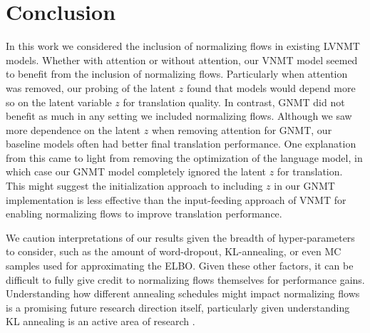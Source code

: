 \chapter{Conclusion}

In this work we considered the inclusion of normalizing flows in existing \ac{LVNMT} models. Whether with attention or without attention, our \ac{VNMT} model seemed to benefit from the inclusion of normalizing flows. Particularly when attention was removed, our probing of the latent $z$ found that models would depend more so on the latent variable $z$ for translation quality. In contrast, \ac{GNMT} did not benefit as much in any setting we included normalizing flows. Although we saw more dependence on the latent $z$ when removing attention for \ac{GNMT}, our baseline models often had better final translation performance. One explanation from this came to light from removing the optimization of the language model, in which case our \ac{GNMT} model completely ignored the latent $z$ for translation. This might suggest the initialization approach to including $z$ in our \ac{GNMT} implementation is less effective than the input-feeding approach of \ac{VNMT} for enabling normalizing flows to improve translation performance.

We caution interpretations of our results given the breadth of hyper-parameters to consider, such as the amount of word-dropout, KL-annealing, or even \ac{MC} samples used for approximating the \ac{ELBO}. Given these other factors, it can be difficult to fully give credit to normalizing flows themselves for performance gains. Understanding how different annealing schedules might impact normalizing flows is a promising future research direction itself, particularly given understanding KL annealing is an active area of research \cite{he2018lagging,sphericallatent2018Xu}.





